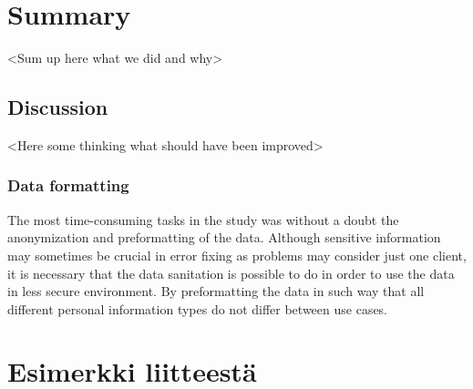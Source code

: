 \documentclass[english, 12pt, a4paper, elec, utf8, a-1b, online]{aaltothesis}
\begin{document}
\clearpage

\section{Summary}\label{sec:summary}

<Sum up here what we did and why>

\subsection{Discussion}\label{subsec:discussion}
<Here some thinking what should have been improved>

\subsubsection*{Data formatting}
The most time-consuming tasks in the study
was without a doubt
the anonymization and preformatting of the data.
Although sensitive information may sometimes be crucial in error fixing
as problems may consider just one client,
it is necessary that the data sanitation is possible to do
in order to use the data in less secure environment.
By preformatting the data in such way
that all different personal information types
do not differ between use cases.


\clearpage





\clearpage

\thesisappendix

\section{Esimerkki liitteestä}\label{sec:LiiteA}


\clearpage
\end{document}
